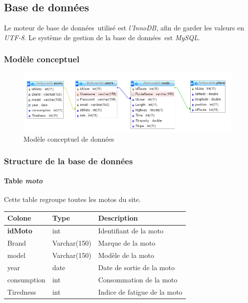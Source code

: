 \documentclass[a4paper]{article}
\newcommand{\bdd}{base de données}
\begin{document}
\subsection{Base de données}
Le moteur de \bdd \ utilisé est \emph{l'InnoDB}, afin de garder les valeurs en \emph{UTF-8}.
Le système de gestion de la \bdd \ est \emph{MySQL}.

\subsubsection{Modèle conceptuel}
\begin{figure}[h]
	\centering
	\includegraphics[width=\textwidth]{./Images/MCD.png}
	\caption{Modèle conceptuel de données}
\end{figure}

\subsubsection{Structure de la \bdd}
\paragraph{Table \emph{moto}}
Cette table regroupe toutes les motos du site.

\begin{tabular}{|l|l|l|}
	\hline
	Colone          & Type         & Description                  \\ \hline\hline
	\textbf{idMoto} & int          & Identifiant de la moto       \\ \hline
	Brand           & Varchar(150) & Marque de la moto            \\ \hline
	model           & Varchar(150) & Modèle de la moto            \\ \hline
	year            & date         & Date de sortie de la moto    \\ \hline
	consumption     & int          & Consommation de la moto      \\ \hline
	Tiredness       & int          & Indice de fatigue de la moto \\ \hline
\end{tabular}
\end{document}
